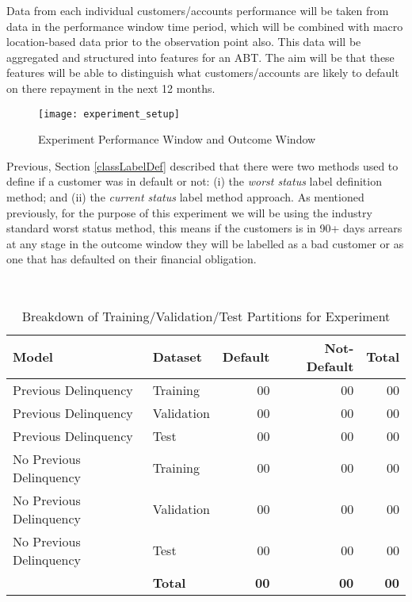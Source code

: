 Data from each individual customers/accounts performance will be taken from data in the performance window time period, which will be combined with macro location-based data prior to the observation point also. This data will be aggregated and structured into features for an ABT. The aim will be that these features will be able to distinguish what customers/accounts are likely to default on there repayment in the next 12 months. 

\begin{figure}[h!]
	\texttt{[image: experiment\_setup]}
	\caption[Experiment Performance Window and Outcome Window]
	{Experiment Performance Window and Outcome Window}
	\label{fig:experiment_setup}
\end{figure}

Previous, Section \ref{classLabelDef} described that there were two methods used to define if a customer was in default or not: (i) the \textit{worst status} label definition method; and (ii) the \textit{current status} label method approach. As mentioned previously, for the purpose of this experiment we will be using the industry standard worst status method, this means if the customers is in 90+ days arrears at any stage in the outcome window they will be labelled as a bad customer or as one that has defaulted on their financial obligation. 

\begin{table}[H]
	\centering\
	\resizebox{\textwidth}{!}
	{
		\begin{tabular}{l| l|r|r|r}
			\hline
			\textbf{Model} &  \textbf{Dataset} & \textbf{Default} & \textbf{Not-Default} & \textbf{Total} \\
			\hline
			Previous Delinquency          & Training       & 00 & 00 & 00 \\
			Previous Delinquency          & Validation       & 00 & 00 & 00 \\
			Previous Delinquency          & Test & 00 & 00 & 00 \\ \hline
			No Previous Delinquency          & Training & 00 & 00 & 00 \\ 
			No Previous Delinquency          & Validation & 00 & 00 & 00 \\
			No Previous Delinquency          & Test & 00 & 00 & 00 \\
			\hline
		       &      	\textbf{Total }     & \textbf{00} & \textbf{00} & \textbf{00} \\ \hline
		\end{tabular}
	}
	\caption{Breakdown of Training/Validation/Test Partitions for Experiment}
\end{table}

